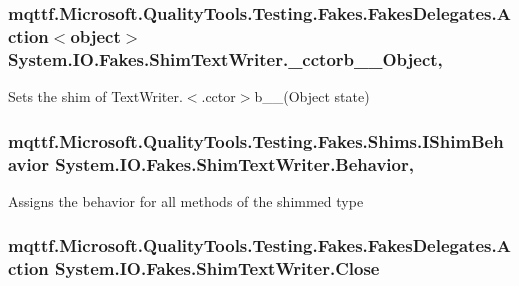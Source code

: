 \hypertarget{class_system_1_1_i_o_1_1_fakes_1_1_shim_text_writer_aadd8da7e1bd704cbe40b1348fd690b32}{
\subsubsection[{\-\_\-cctorb\-\_\-\-\_\-6\-Object}]{\setlength{\rightskip}{0pt plus 5cm}mqttf.\-Microsoft.\-Quality\-Tools.\-Testing.\-Fakes.\-Fakes\-Delegates.\-Action$<$object$>$ System.\-I\-O.\-Fakes.\-Shim\-Text\-Writer.\-\_\-cctorb\-\_\-\-\_\-Object\hspace{0.3cm}{\ttfamily [static]}, {\ttfamily [set]}}}\label{class_system_1_1_i_o_1_1_fakes_1_1_shim_text_writer_aadd8da7e1bd704cbe40b1348fd690b32}


Sets the shim of Text\-Writer.$<$.cctor$>$b\-\_\-\-\_(\-Object state)

\hypertarget{class_system_1_1_i_o_1_1_fakes_1_1_shim_text_writer_a0306efbc932f054655eb61bc2ceb8025}{
\subsubsection[{Behavior}]{\setlength{\rightskip}{0pt plus 5cm}mqttf.\-Microsoft.\-Quality\-Tools.\-Testing.\-Fakes.\-Shims.\-I\-Shim\-Behavior System.\-I\-O.\-Fakes.\-Shim\-Text\-Writer.\-Behavior\hspace{0.3cm}{\ttfamily [static]}, {\ttfamily [set]}}}\label{class_system_1_1_i_o_1_1_fakes_1_1_shim_text_writer_a0306efbc932f054655eb61bc2ceb8025}


Assigns the behavior for all methods of the shimmed type

\hypertarget{class_system_1_1_i_o_1_1_fakes_1_1_shim_text_writer_a76c1f3bf75bc49b0e760d7af23b1bdb2}{
\subsubsection[{Close}]{\setlength{\rightskip}{0pt plus 5cm}mqttf.\-Microsoft.\-Quality\-Tools.\-Testing.\-Fakes.\-Fakes\-Delegates.\-Action System.\-I\-O.\-Fakes.\-Shim\-Text\-Writer.\-Close\hspace{0.3cm}{\ttfamily [set]}}}\label{class_system_1_1_i_o_1_1_fakes_1_1_shim_text_writer_a76c1f3bf75bc49b0e760d7af23b1bdb2}


